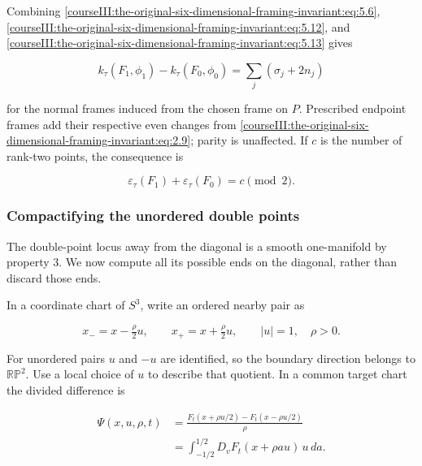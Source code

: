 Combining \eqref{courseIII:the-original-six-dimensional-framing-invariant:eq:5.6}, \eqref{courseIII:the-original-six-dimensional-framing-invariant:eq:5.12}, and \eqref{courseIII:the-original-six-dimensional-framing-invariant:eq:5.13} gives

\begin{equation}
k_\tau(F_1,\phi_1)-k_\tau(F_0,\phi_0)
       =\sum_j(\sigma_j+2n_j)
 \label{courseIII:the-original-six-dimensional-framing-invariant:eq:5.14}
\end{equation}

for the normal frames induced from the chosen frame on \(P\). Prescribed endpoint frames add their respective even changes from \eqref{courseIII:the-original-six-dimensional-framing-invariant:eq:2.9}; parity is unaffected. If \(c\) is the number of rank-two points, the consequence is

\begin{equation}
\varepsilon_\tau(F_1)+\varepsilon_\tau(F_0)
                              =c\pmod2.
 \label{courseIII:the-original-six-dimensional-framing-invariant:eq:5.15}
\end{equation}

\subsubsection{Compactifying the unordered double points}
\label{courseIII:the-original-six-dimensional-framing-invariant:section-5.4}

The double-point locus away from the diagonal is a smooth one-manifold by property 3. We now compute all its possible ends on the diagonal, rather than discard those ends.

In a coordinate chart of \(S^3\), write an ordered nearby pair as

\begin{equation}
x_-=x-\tfrac{\rho}{2}u,\qquad
             x_+=x+\tfrac{\rho}{2}u,\qquad |u|=1,\quad\rho>0.
 \label{courseIII:the-original-six-dimensional-framing-invariant:eq:5.16}
\end{equation}

For unordered pairs \(u\) and \(-u\) are identified, so the boundary direction belongs to \(\mathbb {RP}^2\). Use a local choice of \(u\) to describe that quotient. In a common target chart the divided difference is

\begin{equation}
\begin{split}
 \Psi(x,u,\rho,t)
  &=\frac{F_t(x+\rho u/2)-F_t(x-\rho u/2)}{\rho}\\
  &=\int_{-1/2}^{1/2} D_vF_t(x+\rho a u)\,u\,da.
 \end{split}
 \label{courseIII:the-original-six-dimensional-framing-invariant:eq:5.17}
\end{equation}

